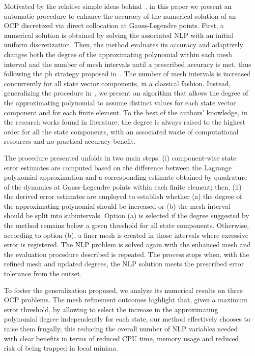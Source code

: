 Motivated by the relative simple ideas behind~\cite{Patterson:OCAM:2015}, in this paper we present an automatic procedure to enhance the accuracy of the numerical solution of an OCP discretized via direct collocation at Gauss-Legendre points. First, a numerical solution is obtained by solving the associated NLP with an initial uniform discretization. Then, the method evaluates its accuracy and adaptively changes both the degree of the approximating polynomial within each mesh interval and the number of mesh intervals until a prescribed accuracy is met, thus following the ph strategy proposed in~\cite{Patterson:OCAM:2015}.
The number of mesh intervals is increased concurrently for all state vector components, in a classical fashion. Instead, generalizing the procedure in~\cite{Patterson:OCAM:2015}, we present an algorithm that allows the degree of the approximating polynomial to assume distinct values for each state vector component and for each finite element. To the best of the authors' knowledge, in the research works found in literature, the degree is always raised to the highest order for all the state components, with an associated waste of computational resources and no practical accuracy benefit.
		
The procedure presented unfolds in two main steps: (i) component-wise state error estimates are computed based on the difference between the Lagrange polynomial approximation and a corresponding estimate obtained by quadrature of the dynamics at Gauss-Legendre points within each finite element; then, (ii) the derived error estimates are employed to establish whether (a) the degree of the approximating polynomial should be increased or (b) the mesh interval should be split into subintervals. Option (a) is selected if the degree suggested by the method remains below a given threshold for all state components. Otherwise, according to option (b), a finer mesh is created in those intervals where excessive error is registered.
The NLP problem is solved again with the enhanced mesh and the evaluation procedure described is repeated. The process stops when, with the refined mesh and updated degrees, the NLP solution meets the prescribed error tolerance from the outset.

To foster the generalization proposed, we analyze its numerical results on three OCP problems. The mesh refinement outcomes highlight that, given a maximum error threshold, by allowing to select the increase in the approximating polynomial degree independently for each state, our method effectively chooses to raise them frugally, this reducing the overall number of NLP variables needed with clear benefits in terms of reduced CPU time, memory usage and reduced risk of being trapped in local minima.

